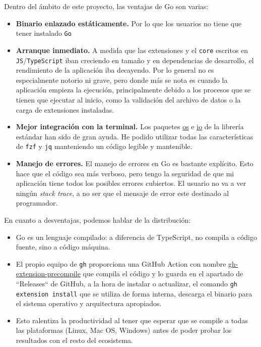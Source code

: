 Dentro del ámbito de este proyecto, las ventajas de Go son varias:
\begin{itemize}
    \item \textbf{Binario enlazado estáticamente.} Por lo que los usuarios no tiene que tener instalado \verb|Go|
    \item \textbf{Arranque inmediato.} A medida que las extensiones y el \verb|core| escritos en \verb|JS|/\verb|TypeScript| iban creciendo en tamaño y en dependencias de desarrollo, el rendimiento de la aplicación iba decayendo. Por lo general no es especialmente notorio ni grave, pero donde más se nota es cuando la aplicación empieza la ejecución, principalmente debido a los procesos que se tienen que ejecutar al inicio, como la validación del archivo de datos o la carga de extensiones instaladas.
    \item \textbf{Mejor integración con la terminal.} Los paquetes \href{https://pkg.go.dev/os}{os} e \href{https://pkg.go.dev/io}{io} de la librería estándar han sido de gran ayuda. He podido utilizar todas las características de \verb|fzf| y \verb|jq| manteniendo un código legible y mantenible.
    \item \textbf{Manejo de errores.} El manejo de errores en Go es bastante explícito. Esto hace que el código sea más verboso, pero tengo la seguridad de que mi aplicación tiene todos los posibles errores cubiertos. El usuario no va a ver ningún \emph{stack trace}, a no ser que el mensaje de error este destinado al programador.
\end{itemize}

En cuanto a desventajas, podemos hablar de la distribución:

\begin{itemize}
    \item Go es un lenguaje compilado: a diferencia de TypeScript, no compila a código fuente, sino a código máquina. 
    \item El propio equipo de \verb|gh| proporciona una GitHub Action \cite{githubAction} con nombre \href{https://github.com/cli/gh-extension-precompile}{gh-extension-precompile} que compila el código y lo guarda en el apartado de ``Releases`` de GitHub, a la hora de instalar o actualizar, el comando \verb|gh extension install| que se utiliza de forma interna, descarga el binario para el sistema operativo y arquitectura apropiados. 
    \item Esto ralentiza la productividad al tener que esperar que se compile a todas las plataformas (Linux, Mac OS, Windows) antes de poder probar los resultados con el resto del ecosistema.
\end{itemize}

